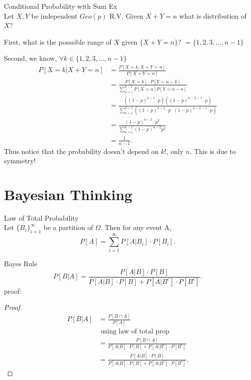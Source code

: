 \documentclass[a4paper]{article}
\begin{document}
\begin{note}{Conditional Probability with Sum Ex}\\
  Let $X,Y$ be independent $Geo(p)$ R.V. Given  $X+Y=n$ what is distribution of  $X$?

  First, what is the posssible range of  $X$ given  $\{X+Y = n\} $? $= \{1,2,3, \ldots, n-1\} $ 

  Second, we know, $\forall k \in \{1,2,3, \ldots, n-1\} $
  \begin{align*}
    P[X=k| X+Y = n] &= \frac{P[X=k, X+Y = n]}{P[X+Y=n]} \\
                    &= \frac{P[X=k] \cdot P[Y = n-k]}{\sum_{a=1}^{n-1} P[X=a]P[Y=n-a]} \\
                    &= \frac{\left( (1-p)^{k-1} \cdot p \right) \left( (1-p)^{n-k-1} \cdot p \right)}{
                    \sum_{a=1}^{n-1} \left( (1-p)^{a-1} \cdot p \cdot (1-p)^{n-a-1} \cdot p \right) } \\
                    &= \frac{(1-p)^{n-2} \cdot p^2}{\sum_{a=1}^{n-1} (1-p)^{n-2}p^2} \\
                    &= \frac{1}{n-1}
  .\end{align*}
  Thus notice that the probability doesn't depend on $k$!, only  $n$. This is due to symmetry!
\end{note}

\section{Bayesian Thinking}
\begin{prop}{Law of Total Probability}\\
  Let  $\{B_i\}_{i=1}^\infty $ be a partition of $\Omega$. Then for any event A,
   \[
     P[A] = \sum_{i=1}^\infty P[A | B_i] \cdot P[B_i]
  .\] 
\end{prop}

\begin{definition}{Bayes Rule} \\
  \[
    P[B|A] = \frac{P[A|B] \cdot P[B]}{P[A|B] \cdot P[B] + P[A|B^c] \cdot P[B^c]}
  .\] 
  proof:
  \begin{proof}
    \begin{align*}
      P[B|A] &= \frac{P[B \cap A]}{P[A]} \\
             & \text{ using law of total prop} \\
             &= \frac{P[B \cap A]}{P[A|B] \cdot P[B] + P[A|B^c] \cdot P[B^c]} \\
             &= \frac{P[A|B] \cdot P[B]}{P[A|B] \cdot P[B] + P[A|B^c] \cdot P[B^c]}
    .\end{align*}
  \end{proof}
\end{definition}
\end{document}
